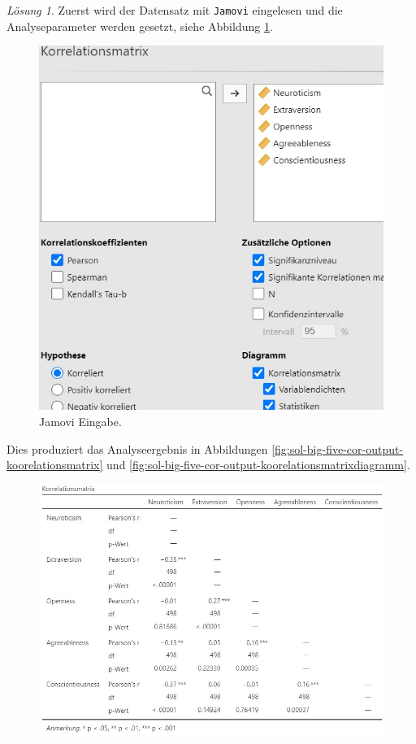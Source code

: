 \documentclass[
]{book}
\theoremstyle{definition}
\theoremstyle{definition}
\theoremstyle{definition}
\theoremstyle{definition}
\theoremstyle{remark}
\newtheorem*{solution}{Lösung}
\begin{document}
\begin{solution}

Zuerst wird der Datensatz mit \texttt{Jamovi} eingelesen und die Analyseparameter werden gesetzt, siehe Abbildung \ref{fig:sol-big-five-cor-input}.

\begin{figure}

{\centering \includegraphics[width=1\linewidth]{figures/08-exr-big-five-cor-jmv-input} 

}

\caption{Jamovi Eingabe.}\label{fig:sol-big-five-cor-input}
\end{figure}

Dies produziert das Analyseergebnis in Abbildungen \ref{fig:sol-big-five-cor-output-koorelationsmatrix} und \ref{fig:sol-big-five-cor-output-koorelationsmatrixdiagramm}.

\begin{figure}

{\centering \includegraphics[width=1\linewidth]{figures/08-exr-big-five-cor-jmv-output-korrelationsmatrix} 

}
\end{figure}
\end{solution}
\end{document}
